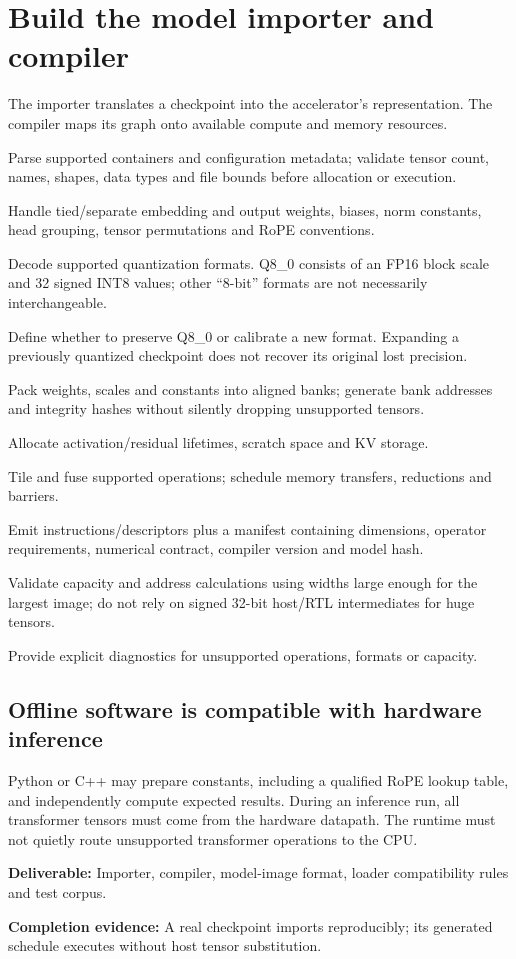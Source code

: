\documentclass[11pt,a4paper]{article}
\newcommand{\phase}[2]{\clearpage\section{#1}\label{#2}}
\newcommand{\deliver}[2]{\begin{tcolorbox}[colback=pale,colframe=line,boxrule=0.5pt,arc=1mm,left=8pt,right=8pt,top=6pt,bottom=6pt]\textbf{Deliverable:} #1\par\textbf{Completion evidence:} #2\end{tcolorbox}}
\begin{document}
\phase{Build the model importer and compiler}{sec:compiler}
The importer translates a checkpoint into the accelerator's representation. The
compiler maps its graph onto available compute and memory resources.
\begin{checklist}
\item Parse supported containers and configuration metadata; validate tensor count,
names, shapes, data types and file bounds before allocation or execution.
\item Handle tied/separate embedding and output weights, biases, norm constants,
head grouping, tensor permutations and RoPE conventions.
\item Decode supported quantization formats. Q8\_0 consists of an FP16 block scale
and 32 signed INT8 values; other ``8-bit'' formats are not necessarily interchangeable.
\item Define whether to preserve Q8\_0 or calibrate a new format. Expanding a
previously quantized checkpoint does not recover its original lost precision.
\item Pack weights, scales and constants into aligned banks; generate bank addresses
and integrity hashes without silently dropping unsupported tensors.
\item Allocate activation/residual lifetimes, scratch space and KV storage.
\item Tile and fuse supported operations; schedule memory transfers, reductions and barriers.
\item Emit instructions/descriptors plus a manifest containing dimensions, operator
requirements, numerical contract, compiler version and model hash.
\item Validate capacity and address calculations using widths large enough for the
largest image; do not rely on signed 32-bit host/RTL intermediates for huge tensors.
\item Provide explicit diagnostics for unsupported operations, formats or capacity.
\end{checklist}
\subsection*{Offline software is compatible with hardware inference}
Python or C++ may prepare constants, including a qualified RoPE lookup table,
and independently compute expected results. During an inference run, all
transformer tensors must come from the hardware datapath. The runtime must not
quietly route unsupported transformer operations to the CPU.
\deliver{Importer, compiler, model-image format, loader compatibility rules and
test corpus.}{A real checkpoint imports reproducibly; its generated schedule
executes without host tensor substitution.}
\end{document}
